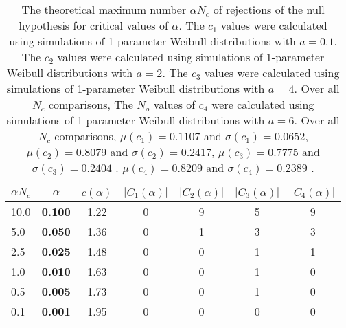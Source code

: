 \begin{table}[h!]
\begin{center}
\begin{tabular}{| l | c | c | c | c | c | c |}\hline
$\alpha N_c$ & $\alpha$ & $c(\alpha)$ & $|C_1(\alpha)|$ & $|C_2(\alpha)|$ & $|C_3(\alpha)|$ & $|C_4(\alpha)|$ \\\hline\hline
10.0 & {\bf 0.100} & 1.22 & 0 & 9 & 5 & 9 \\\hline
5.0 & {\bf 0.050} & 1.36 & 0 & 1 & 3 & 3 \\\hline
2.5 & {\bf 0.025} & 1.48 & 0 & 0 & 1 & 1 \\\hline
1.0 & {\bf 0.010} & 1.63 & 0 & 0 & 1 & 0 \\\hline
0.5 & {\bf 0.005} & 1.73 & 0 & 0 & 1 & 0 \\\hline
0.1 & {\bf 0.001} & 1.95 & 0 & 0 & 0 & 0 \\\hline
\end{tabular}
\caption{The theoretical maximum number $\alpha N_c$ of rejections
        of the null hypothesis for critical values of $\alpha$.
        The $c_1$ values were calculated using simulations of 1-parameter Weibull distributions with $a=0.1$.
        The $c_2$ values were calculated using simulations of 1-parameter Weibull distributions with $a=2$.
        The $c_3$ values were calculated using simulations of 1-parameter Weibull distributions with $a=4$.
        Over all $N_c$ comparisons,
        The $N_o$ values of $c_4$ were calculated using simulations of
         1-parameter Weibull distributions with $a=6$.
        Over all $N_c$ comparisons,
         $\mu(c_1)=0.1107$ and $\sigma(c_1)=0.0652$,
         $\mu(c_2)=0.8079$ and $\sigma(c_2)=0.2417$,
         $\mu(c_3)=0.7775$ and $\sigma(c_3)=0.2404$ .
         $\mu(c_4)=0.8209$ and $\sigma(c_4)=0.2389$ .
        }
\end{center}
\end{table}
